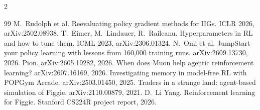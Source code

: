 \documentclass[10pt]{article}
\begin{document}
{\scriptsize\begin{multicols}{2}
\begin{thebibliography}{99}\setlength{\itemsep}{-2pt}\renewcommand{\section}[2]{}
 M.~Rudolph et al. Reevaluating policy gradient methods for IIGs. ICLR 2026, arXiv:2502.08938.
 T.~Eimer, M.~Lindauer, R.~Raileanu. Hyperparameters in RL and how to tune them. ICML 2023, arXiv:2306.01324.
 N.~Omi et al. JumpStart your policy learning with lessons from 160,000 training runs. arXiv:2609.13730, 2026.
 Pion. arXiv:2605.19282, 2026.
 When does Muon help agentic reinforcement learning? arXiv:2607.16169, 2026.
 Investigating memory in model-free RL with POPGym Arcade. arXiv:2503.01450, 2025.
 Traders in a strange land: agent-based simulation of Figgie. arXiv:2110.00879, 2021.
 D.~Li Yang. Reinforcement learning for Figgie. Stanford CS224R project report, 2026.
\end{thebibliography}\end{multicols}}
\end{document}
